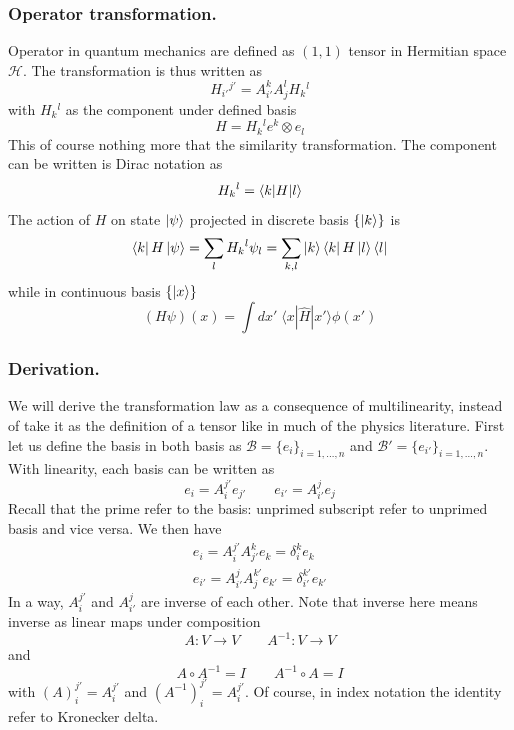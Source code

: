 \documentclass[../../../main.tex]{subfiles}
\begin{document}
\subsubsection{Operator transformation.}
Operator in quantum mechanics are defined as $(1,1)$ tensor in Hermitian space $\mathcal{H}$.
The transformation is thus written as
\begin{equation*}
  H_{i'}{}^{j'}   = A^{k}_{i'} A^{l}_{j} H_{k}{}^{l}  
\end{equation*} 
with $H_{k}{}^{l}  $ as the component under defined basis 
\begin{equation*}
  H =  H_{k}{}^{l}  e ^{k } \otimes e _{l}
\end{equation*}
This of course nothing more that the similarity transformation.
The component can be written is Dirac notation as 
\begin{equation*}
  H_{k}{}^{l}  = \braket{k  | H|l}
\end{equation*}
The action of $H$ on state $\ket{\psi}$ projected in discrete basis $\left\{ \ket{k} \right\} $ is 
\begin{equation*}
  \bra{k} H \ket{\psi} = \sum_{l}H_{k}{}^{l} \psi_l =  \sum_{k,l} \ket{k }\bra{k }H \ket{l }\bra{l}
\end{equation*}
while in continuous basis $\left\{ \ket{x} \right\} $
\begin{equation*}
  (H\psi)(x) 
  =\int dx'\;\langle x| \hat{H} |x'\rangle \phi(x')
\end{equation*}

\subsubsection{Derivation.}
We will derive the transformation law as a consequence of multilinearity, instead of take it as the definition of a tensor like in much of the physics literature.
First let us define the basis in both basis as $\mathcal{B}=\{e_i\}_{i=1,\dots,n}$ and $\mathcal{B}'=\{e_{i'}\}_{i=1,\dots,n}$.
With linearity, each basis can be written as
\begin{equation*}
  e_{i} = A_{i}^{j'} e_{j'}\qquad
  e_{i'} = A_{i'}^{j} e_{j}
\end{equation*}
Recall that the prime refer to the basis: unprimed subscript refer to unprimed basis and vice versa.
We then have
\begin{align*}
  e_{i} = A_{i}^{j'} A_{j'}^{k} e_{k} = \delta_{i}^{k} e_{k}
  \\
  e_{i'} = A_{i'}^{j} A_{j}^{k'} e_{k'} = \delta_{i'}^{k'} e_{k'}
\end{align*}
In a way, $A_{i}^{j'}$ and $A_{i'}^{j}$ are inverse of each other.
Note that inverse here means inverse as linear maps under composition
\begin{equation*}
  A : V \rightarrow V\qquad
  A^{-1} : V \rightarrow V
\end{equation*}
and
\begin{equation*}
  A \circ A^{-1} = I \qquad
  A^{-1} \circ A = I
\end{equation*}
with $(A)^{j'}_{i} = A^{j'}_{i}$ and $(A^{-1})^{j'}_{i} = A^{j'}_{i}$.
Of course, in index notation the identity refer to Kronecker delta.
\end{document}
